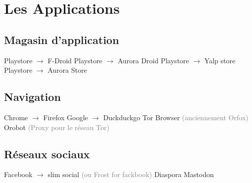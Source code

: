 \documentclass[aspectratio=169]{beamer}
\begin{document}

\section{Les Applications}

\begin{frame}
\begin{center}
\huge{\color{cvp}{Les Applications}}
\end{center}
\end{frame}

\subsection{Magasin d'application}

\begin{frame}
Playstore $\to$ F-Droid\newline
Playstore $\to$ Aurora Droid\newline
\newline
Playstore $\to$ Yalp store\newline
Playstore $\to$ Aurora Store
\end{frame}

\subsection{Navigation}
\begin{frame}
Chrome $\to$ Firefox\newline
Google $\to$ Duckduckgo\newline
\newline
Tor Browser \textcolor{gray}{\tiny{(anciennement Orfox)}}\newline
\newline
Orobot \textcolor{gray}{\tiny{(Proxy pour le réseau Tor)}}
\end{frame}

\subsection{Réseaux sociaux}
\begin{frame}
Facebook $\to$ slim social \textcolor{gray}{\tiny{(ou Frost for fackbook)}}\newline
\newline
Diaspora\newline
Mastodon
\end{frame}
\end{document}
